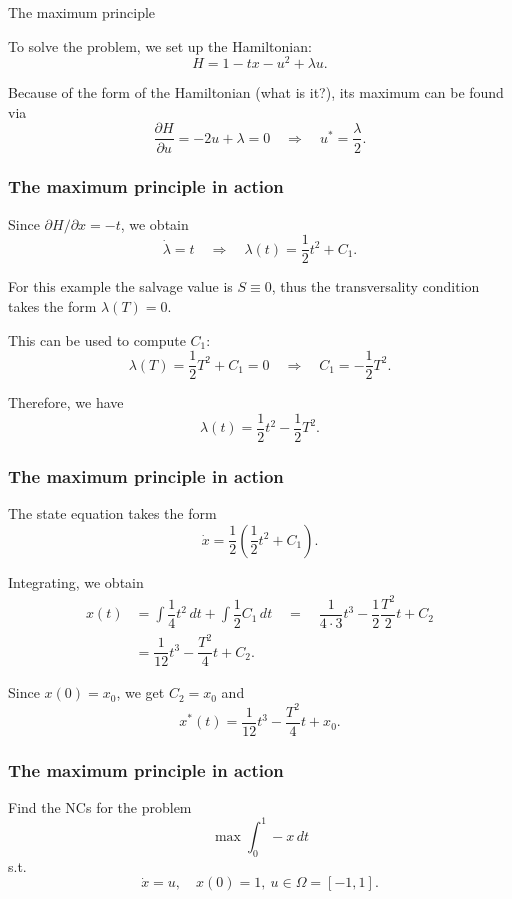 \documentclass[10pt]{beamer}
\theoremstyle{definition}
\begin{document}
\begin{section}{The maximum principle}
\begin{frame}[fragile]
\begin{example}
To solve the problem, we set up the Hamiltonian:
\[ H = 1-t x - u^2 + \lambda u .\]

Because of the form of the Hamiltonian (what is it?), its maximum can be found via \[ \dfrac{\partial H}{\partial u} = -2u+\lambda = 0 \quad \Rightarrow \quad u^* = \dfrac{\lambda}{2}. \]
\label{ex:simpleOC}
\end{example}
\end{frame}

\begin{frame}[fragile]
\frametitle{The maximum principle in action}\addtocounter{theorem}{-1}
\begin{example}[cont.]
Since $ \partial H/\partial x = -t $, we obtain \[ \dot{\lambda} = t \quad \Rightarrow \quad \lambda (t) = \dfrac{1}{2}t^2 + C_1. \]

For this example the salvage value is $ S \equiv 0 $, thus the transversality condition takes the form $ \lambda(T) = 0 $.

This can be used to compute $ C_1 $:
\[ \lambda (T) = \dfrac{1}{2}T^2 + C_1 = 0 \quad \Rightarrow \quad C_1 =-\dfrac{1}{2}T^2. \]

Therefore, we have \[ \lambda (t) = \dfrac{1}{2}t^2-\dfrac{1}{2}T^2. \]
\end{example}
\end{frame}

\begin{frame}[fragile]
\frametitle{The maximum principle in action}\addtocounter{theorem}{-1}
\begin{example}[cont.]
The state equation takes the form \[ \dot{x} = \frac{1}{2}\left(\frac{1}{2}t^2 + C_1 \right). \]

Integrating, we obtain \[ \begin{split}
x(t) & = \int \dfrac{1}{4}t^2 \,dt + \int \dfrac{1}{2}C_1\,dt \quad
= \quad  \dfrac{1}{4\cdot 3}t^3 - \dfrac{1}{2}\dfrac{T^2}{2}t + C_2\\
& =  \dfrac{1}{12}t^3 - \dfrac{T^2}{4}t + C_2.
\end{split}   \]

Since $ x(0)=x_0 $, we get $ C_2 = x_0 $ and 
\[ x^*(t) = \dfrac{1}{12}t^3 - \dfrac{T^2}{4}t + x_0. \]
\end{example}
\end{frame}

\begin{frame}[fragile]
\frametitle{The maximum principle in action}
\begin{example}
Find the NCs for the problem
\[ \max \int_{0}^{1}-x\,dt \]
s.t. \[ \dot{x}=u,\quad x(0)=1,~u\in \Omega = [-1,1]. \]\bigskip \pause


\end{example}
\end{frame}
\end{section}
\end{document}

